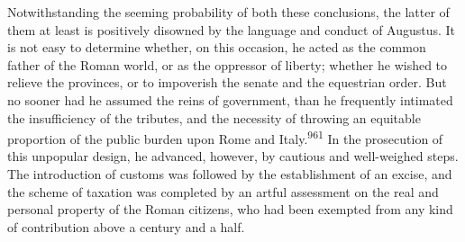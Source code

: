 Notwithstanding the seeming probability of both these
conclusions, the latter of them at least is positively disowned
by the language and conduct of Augustus. It is not easy to
determine whether, on this occasion, he acted as the common
father of the Roman world, or as the oppressor of liberty;
whether he wished to relieve the provinces, or to impoverish the
senate and the equestrian order. But no sooner had he assumed the
reins of government, than he frequently intimated the
insufficiency of the tributes, and the necessity of throwing an
equitable proportion of the public burden upon Rome and Italy.\textsuperscript{961}
In the prosecution of this unpopular design, he advanced,
however, by cautious and well-weighed steps. The introduction of
customs was followed by the establishment of an excise, and the
scheme of taxation was completed by an artful assessment on the
real and personal property of the Roman citizens, who had been
exempted from any kind of contribution above a century and a
half.



